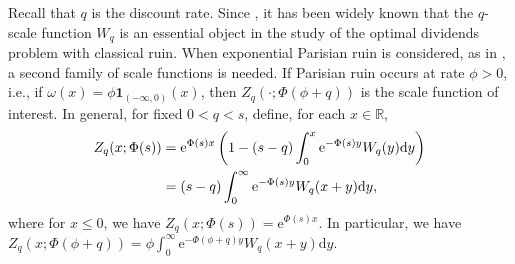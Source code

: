 \documentclass[10pt,a4paper]{amsart}
\newtheorem{lemma}{Lemma}[section]
\newcommand{\reals}{\mathbb{R}}
\newcommand{\ind}{\mathbf{1}}
\renewcommand{\leq}{\leqslant}
\let\cites\cite
\begin{document}
Recall that $q$ is the discount rate. Since \cites{avram-et-al_2007,loeffen_2008}, it has been widely known that the $q$-scale function $W_q$ is an essential object in the study of the optimal dividends problem with classical ruin. When exponential Parisian ruin is considered, as in \cite{renaud2019}, a second family of scale functions is needed. If Parisian ruin occurs at rate $\phi>0$, i.e., if $\omega(x) = \phi \ind_{(-\infty,0)}(x)$, then $Z_q (\cdot;\Phi(\phi+q))$ is the scale function of interest. In general, for fixed $0<q<s$, define, for each $x \in \reals$,
\begin{align}
	Z_q (x;\Phi(s)) &= \mathrm{e}^{\Phi(s)x} \left(1-(s-q) \int_0^x \mathrm{e}^{-\Phi(s)y} W_{q}(y) \mathrm{d}y \right)\label{eq:Zq-def} \\
	&= (s-q) \int_0^\infty \mathrm{e}^{-\Phi(s)y} W_{q}(x+y) \mathrm{d}y ,\notag
\end{align}
where for $x \leq 0$, we have $Z_q (x;\Phi(s))=\mathrm{e}^{\Phi(s) x}$.  In particular, we have $Z_q (x;\Phi(\phi+q))= \phi \int_0^\infty \mathrm{e}^{-\Phi(\phi+q)y} W_q(x+y) \mathrm{d}y$.

%
%
%
\end{document}
